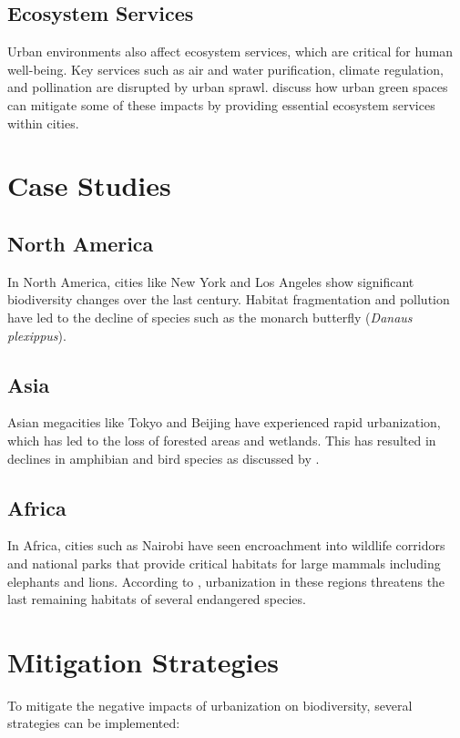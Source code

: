\documentclass[12pt]{article}
\begin{document}
\subsection{Ecosystem Services}
Urban environments also affect ecosystem services, which are critical for human well-being. Key services such as air and water purification, climate regulation, and pollination are disrupted by urban sprawl. \citet{bolund1999} discuss how urban green spaces can mitigate some of these impacts by providing essential ecosystem services within cities.

\section{Case Studies}

\subsection{North America}
In North America, cities like New York and Los Angeles show significant biodiversity changes over the last century. Habitat fragmentation and pollution have led to the decline of species such as the monarch butterfly (\textit{Danaus plexippus}).

\subsection{Asia}
Asian megacities like Tokyo and Beijing have experienced rapid urbanization, which has led to the loss of forested areas and wetlands. This has resulted in declines in amphibian and bird species as discussed by \citet{saito2021}.

\subsection{Africa}
In Africa, cities such as Nairobi have seen encroachment into wildlife corridors and national parks that provide critical habitats for large mammals including elephants and lions. According to \citet{okanga2017}, urbanization in these regions threatens the last remaining habitats of several endangered species.

\section{Mitigation Strategies}
To mitigate the negative impacts of urbanization on biodiversity, several strategies can be implemented:
\end{document}
